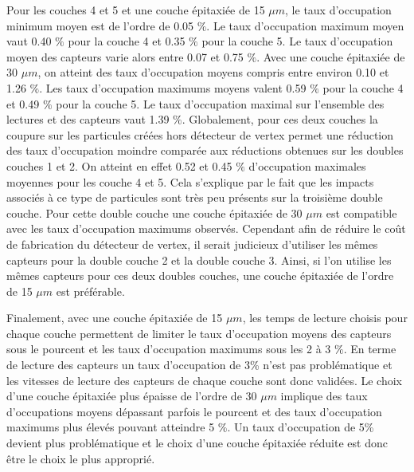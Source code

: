    Pour les couches 4 et 5 et une couche \'epitaxi\'ee de 15 $\mu m$, le taux d'occupation minimum moyen est de l'ordre de 0.05 $\%$. Le taux d'occupation maximum moyen vaut 0.40 $\%$ pour la couche 4 et 0.35 $\%$ pour la couche 5. Le taux d'occupation moyen des capteurs varie alors entre 0.07 et 0.75 $\%$. Avec une couche \'epitaxi\'ee de 30 $\mu m$, on atteint des taux d'occupation moyens compris entre environ 0.10 et 1.26 $\%$. Les taux d'occupation maximums moyens valent 0.59 $\%$ pour la couche 4 et 0.49 $\%$ pour la couche 5. Le taux d'occupation maximal sur l'ensemble des lectures et des capteurs vaut 1.39 $\%$. Globalement, pour ces deux couches la coupure sur les particules cr\'e\'ees hors d\'etecteur de vertex permet une r\'eduction des taux d'occupation moindre compar\'ee aux r\'eductions obtenues sur les doubles couches 1 et 2. On atteint en effet 0.52 et 0.45 $\%$ d'occupation maximales moyennes pour les couche 4 et 5. Cela s'explique par le fait que les impacts associ\'es \`a ce type de particules sont tr\`es peu pr\'esents sur la troisi\`eme double couche. Pour cette double couche une couche \'epitaxi\'ee de 30 $\mu m$ est compatible avec les taux d'occupation maximums observ\'es. Cependant afin de r\'eduire le co\^ut de fabrication du d\'etecteur de vertex, il serait judicieux d'utiliser les m\^emes capteurs pour la double couche 2 et la double couche 3. Ainsi, si l'on utilise les m\^emes capteurs pour ces deux doubles couches, une couche \'epitaxi\'ee de l'ordre de 15 $\mu m$ est pr\'ef\'erable. 
   
   \medskip
   
   Finalement, avec une couche \'epitaxi\'ee de 15 $\mu m$, les temps de lecture choisis pour chaque couche permettent de limiter le taux d'occupation moyens des capteurs sous le pourcent et les taux d'occupation maximums sous les 2 \`a 3 $\%$. En terme de lecture des capteurs un taux d'occupation de 3\% n'est pas probl\'ematique et les vitesses de lecture des capteurs de chaque couche sont donc valid\'ees. Le choix d'une couche \'epitaxi\'ee plus \'epaisse de l'ordre de 30 $\mu m$ implique des taux d'occupations moyens d\'epassant parfois le pourcent et des taux d'occupation maximums plus \'elev\'es pouvant atteindre 5 $\%$. Un taux d'occupation de 5\% devient plus probl\'ematique et le choix d'une couche \'epitaxi\'ee r\'eduite est donc \^etre le choix le plus appropri\'e.

  
%   
%   
   
